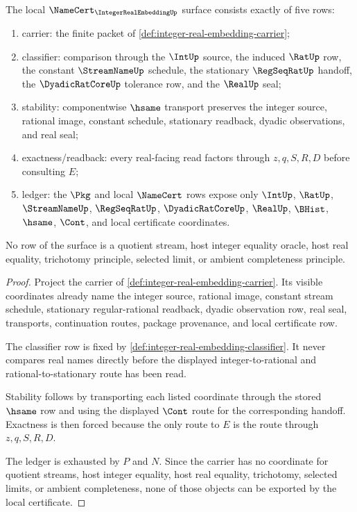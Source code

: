 \begin{theorem}
\label{thm:integer-real-embedding-namecert-obligations}
The local $\NameCert_{\IntegerRealEmbeddingUp}$ surface consists exactly of five rows:
\begin{enumerate}
\item carrier: the finite packet of \autoref{def:integer-real-embedding-carrier};
\item classifier: comparison through the $\IntUp$ source, the induced $\RatUp$ row, the constant $\StreamNameUp$ schedule, the stationary $\RegSeqRatUp$ handoff, the $\DyadicRatCoreUp$ tolerance row, and the $\RealUp$ seal;
\item stability: componentwise $\hsame$ transport preserves the integer source, rational image, constant schedule, stationary readback, dyadic observations, and real seal;
\item exactness/readback: every real-facing read factors through $z,q,S,R,D$ before consulting $E$;
\item ledger: the $\Pkg$ and local $\NameCert$ rows expose only $\IntUp$, $\RatUp$, $\StreamNameUp$, $\RegSeqRatUp$, $\DyadicRatCoreUp$, $\RealUp$, $\BHist$, $\hsame$, $\Cont$, and local certificate coordinates.
\end{enumerate}
No row of the surface is a quotient stream, host integer equality oracle, host real equality, trichotomy principle, selected limit, or ambient completeness principle.
\end{theorem}
\begin{proof}
Project the carrier of \autoref{def:integer-real-embedding-carrier}. Its visible coordinates already name the integer source, rational image, constant stream schedule, stationary regular-rational readback, dyadic observation row, real seal, transports, continuation routes, package provenance, and local certificate row.

The classifier row is fixed by \autoref{def:integer-real-embedding-classifier}. It never compares real names directly before the displayed integer-to-rational and rational-to-stationary route has been read.

Stability follows by transporting each listed coordinate through the stored $\hsame$ row and using the displayed $\Cont$ route for the corresponding handoff. Exactness is then forced because the only route to $E$ is the route through $z,q,S,R,D$.

The ledger is exhausted by $P$ and $N$. Since the carrier has no coordinate for quotient streams, host integer equality, host real equality, trichotomy, selected limits, or ambient completeness, none of those objects can be exported by the local certificate.
\end{proof}

